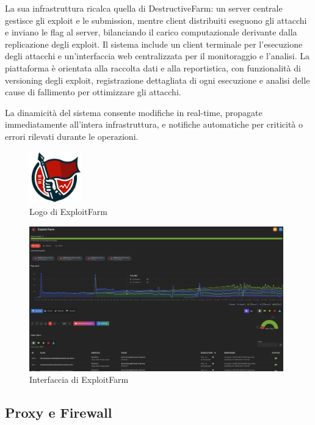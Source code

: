 La sua infrastruttura ricalca quella di DestructiveFarm: un server centrale gestisce gli exploit e le submission, mentre client distribuiti eseguono gli attacchi e inviano le flag al server, bilanciando il carico computazionale derivante dalla replicazione degli exploit. Il sistema include un client terminale per l’esecuzione degli attacchi e un’interfaccia web centralizzata per il monitoraggio e l’analisi. La piattaforma è orientata alla raccolta dati e alla reportistica, con funzionalità di versioning degli exploit, registrazione dettagliata di ogni esecuzione e analisi delle cause di fallimento per ottimizzare gli attacchi.

La dinamicità del sistema consente modifiche in real-time, propagate immediatamente all’intera infrastruttura, e notifiche automatiche per criticità o errori rilevati durante le operazioni.

\begin{figure}[H]
    \centering
    \includegraphics[width=0.20\textwidth]{images/chapter1/ExploitFarmLogo.png}
    \caption{Logo di ExploitFarm}\label{fig:exploitfarm}
\end{figure}

\begin{figure}[H]
    \centering
    \includegraphics[width=0.98\textwidth]{images/chapter1/exploitfarm_interface.png}
    \caption{Interfaccia di ExploitFarm}\label{fig:exploitfarm_interface}
\end{figure}

\subsection{Proxy e Firewall}

